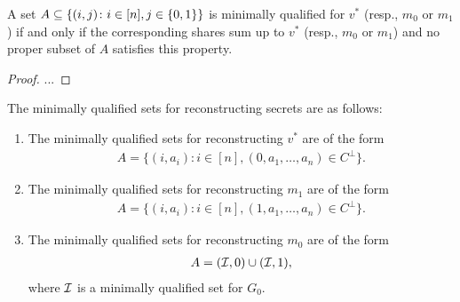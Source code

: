 \begin{myclaim}\label{clm:min-secret}
	A set $A \subseteq \{(i,j)\colon i \in [n], j \in {\{0,1\}} \}$ is minimally qualified for $v^*$ (resp., $m_0$ or $m_1$) if and only if the corresponding shares sum up to $v^*$ (resp., $m_0$ or $m_1$) and no proper subset of $A$ satisfies this property.
\end{myclaim}
\begin{proof}
	...
\end{proof}


\begin{lemma}
	The minimally qualified sets for reconstructing secrets are as follows:
	\begin{enumerate}
		\item The minimally qualified sets for reconstructing $v^*$ are of the form
		\begin{align*}
			A = \{ (i,a_i)\colon i \in [n], (0,a_1,\dotsc, a_n) \in C^\perp \}.
		\end{align*}
		\item The minimally qualified sets for reconstructing $m_1$ are of the form
		\begin{align*}
			A = \{ (i,a_i)\colon i \in [n], (1,a_1,\dotsc, a_n) \in C^\perp \}.
		\end{align*}
		\item The minimally qualified sets for reconstructing $m_0$ are of the form
		\begin{align*}
			A = ({\mathcal I},0) \cup ({\mathcal I}, 1),
		\end{align*}
		where ${\mathcal I}$ is a minimally qualified set for $G_0$.
	\end{enumerate}
\end{lemma}
